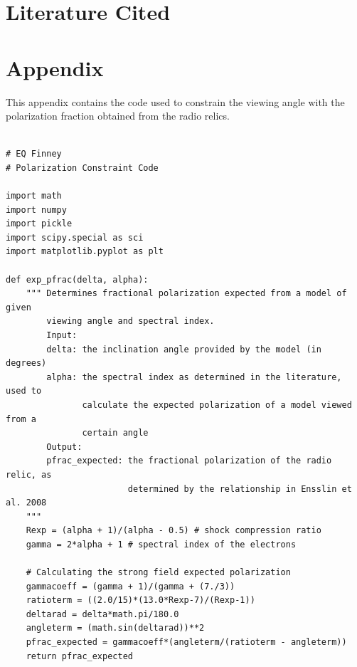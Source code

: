 \documentclass[12 pt]{article}
\renewcommand{\baselinestretch}{2}
\begin{document}
\newpage
\section*{Literature Cited}




\newpage
\section*{Appendix}

This appendix contains the code used to constrain the viewing angle with the polarization fraction obtained from the radio relics.

\renewcommand{\baselinestretch}{1}
\begin{verbatim}

# EQ Finney
# Polarization Constraint Code

import math
import numpy
import pickle
import scipy.special as sci
import matplotlib.pyplot as plt

def exp_pfrac(delta, alpha):
    """ Determines fractional polarization expected from a model of given
        viewing angle and spectral index.
        Input:
        delta: the inclination angle provided by the model (in degrees)
        alpha: the spectral index as determined in the literature, used to
               calculate the expected polarization of a model viewed from a
               certain angle
        Output:
        pfrac_expected: the fractional polarization of the radio relic, as
                        determined by the relationship in Ensslin et al. 2008
    """
    Rexp = (alpha + 1)/(alpha - 0.5) # shock compression ratio
    gamma = 2*alpha + 1 # spectral index of the electrons

    # Calculating the strong field expected polarization
    gammacoeff = (gamma + 1)/(gamma + (7./3))
    ratioterm = ((2.0/15)*(13.0*Rexp-7)/(Rexp-1))
    deltarad = delta*math.pi/180.0
    angleterm = (math.sin(deltarad))**2
    pfrac_expected = gammacoeff*(angleterm/(ratioterm - angleterm))
    return pfrac_expected



\end{verbatim}
\end{document}
